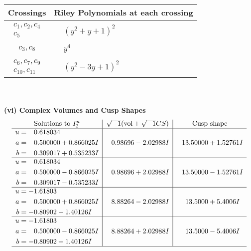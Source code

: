 \documentclass[1p]{elsarticle_modified}
\theoremstyle{definition}
\newcommand{\I}{\sqrt{-1}}
\begin{document}
\begin{tabular}{m{50pt}|m{274pt}}
Crossings & \hspace{64pt}Riley Polynomials at each crossing \\
\hline $$\begin{aligned}c_{1},c_{2},c_{4}\\c_{5}\end{aligned}$$&$\begin{aligned}
&(y^2+y+1)^2
\end{aligned}$\\
\hline $$\begin{aligned}c_{3},c_{8}\end{aligned}$$&$\begin{aligned}
&y^4
\end{aligned}$\\
\hline $$\begin{aligned}c_{6},c_{7},c_{9}\\c_{10},c_{11}\end{aligned}$$&$\begin{aligned}
&(y^2-3 y+1)^2
\end{aligned}$\\
\hline
\end{tabular}\\~\\
\newpage\flushleft \textbf{(vi) Complex Volumes and Cusp Shapes}
$$\begin{array}{c|c|c}  
\text{Solutions to }I^u_{2}& \I (\text{vol} + \sqrt{-1}CS) & \text{Cusp shape}\\
 \hline 
\begin{aligned}
u &= \phantom{-}0.618034\phantom{ +0.000000I} \\
a &= \phantom{-}0.500000 + 0.866025 I \\
b &= \phantom{-}0.309017 + 0.535233 I\end{aligned}
 & \phantom{-}0.98696 - 2.02988 I & \phantom{-}13.50000 + 1.52761 I \\ \hline\begin{aligned}
u &= \phantom{-}0.618034\phantom{ +0.000000I} \\
a &= \phantom{-}0.500000 - 0.866025 I \\
b &= \phantom{-}0.309017 - 0.535233 I\end{aligned}
 & \phantom{-}0.98696 + 2.02988 I & \phantom{-}13.50000 - 1.52761 I \\ \hline\begin{aligned}
u &= -1.61803\phantom{ +0.000000I} \\
a &= \phantom{-}0.500000 + 0.866025 I \\
b &= -0.80902 - 1.40126 I\end{aligned}
 & \phantom{-}8.88264 - 2.02988 I & \phantom{-}13.5000 + 5.4006 I \\ \hline\begin{aligned}
u &= -1.61803\phantom{ +0.000000I} \\
a &= \phantom{-}0.500000 - 0.866025 I \\
b &= -0.80902 + 1.40126 I\end{aligned}
 & \phantom{-}8.88264 + 2.02988 I & \phantom{-}13.5000 - 5.4006 I\\
 \hline 
 \end{array}$$\newpage
\end{document}
